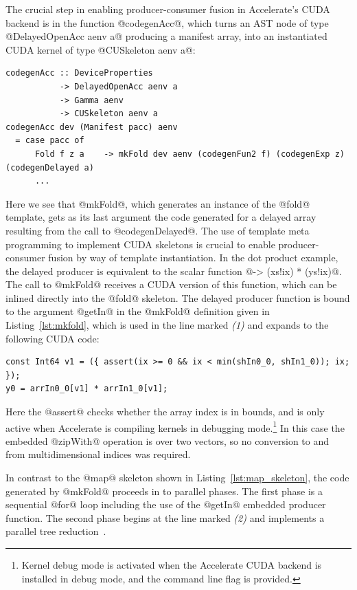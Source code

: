 The crucial step in enabling producer-consumer fusion in Accelerate's CUDA
backend is in the function @codegenAcc@, which turns an AST node of type
@DelayedOpenAcc aenv a@ producing a manifest array, into an instantiated CUDA
kernel of type @CUSkeleton aenv a@:
%
\begin{lstlisting}[style=haskell]
codegenAcc :: DeviceProperties
           -> DelayedOpenAcc aenv a
           -> Gamma aenv
           -> CUSkeleton aenv a
codegenAcc dev (Manifest pacc) aenv
  = case pacc of
      Fold f z a    -> mkFold dev aenv (codegenFun2 f) (codegenExp z) (codegenDelayed a)
      ...
\end{lstlisting}
%
Here we see that @mkFold@, which generates an instance of the @fold@
template, gets as its last argument the code generated for a delayed array
resulting from the call to @codegenDelayed@. The use of template meta
programming to implement CUDA skeletons is crucial to enable producer-consumer
fusion by way of template instantiation. In the dot product example, the delayed
producer is equivalent to the scalar function @\ix -> (xs!ix) * (ys!ix)@.
The call to @mkFold@ receives a CUDA version of this function, which can be
inlined directly into the @fold@ skeleton. The delayed producer function is
bound to the argument @getIn@ in the @mkFold@ definition given in
Listing~\ref{lst:mkfold}, which is used in the line marked \emph{(1)} and
expands to the following CUDA code:
%
\begin{lstlisting}[style=haskell]
const Int64 v1 = ({ assert(ix >= 0 && ix < min(shIn0_0, shIn1_0)); ix; });
y0 = arrIn0_0[v1] * arrIn1_0[v1];
\end{lstlisting}
%
Here the @assert@ checks whether the array index is in bounds, and is only
active when Accelerate is compiling kernels in debugging mode.\footnote{Kernel
debug mode is activated when the Accelerate CUDA backend is installed in debug
mode, and the command line flag  is provided.} In this case the
embedded @zipWith@ operation is over two vectors, so no conversion to and
from multidimensional indices was required.

In contrast to the @map@ skeleton shown in Listing~\ref{lst:map_skeleton},
the code generated by @mkFold@ proceeds in to parallel phases. The first
phase is a sequential @for@ loop including the use of the @getIn@
embedded producer function. The second phase begins at the line marked
\emph{(2)} and implements a parallel tree reduction~\cite{Chatterjee:2009vh}.

